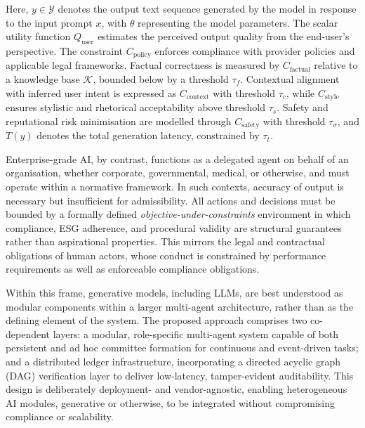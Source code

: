 \documentclass[oneside,10pt]{swissi}
\begin{document}
Here, $y \in \mathcal{Y}$ denotes the output text sequence generated by the model in response to the input prompt $x$, with $\theta$ representing the model parameters. The scalar utility function $Q_{\text{user}}$ estimates the perceived output quality from the end-user’s perspective. The constraint $C_{\text{policy}}$ enforces compliance with provider policies and applicable legal frameworks. Factual correctness is measured by $C_{\text{factual}}$ relative to a knowledge base $\mathcal{K}$, bounded below by a threshold $\tau_f$. Contextual alignment with inferred user intent is expressed as $C_{\text{context}}$ with threshold $\tau_c$, while $C_{\text{style}}$ ensures stylistic and rhetorical acceptability above threshold $\tau_s$. Safety and reputational risk minimisation are modelled through $C_{\text{safety}}$ with threshold $\tau_{\sigma}$, and $T(y)$ denotes the total generation latency, constrained by $\tau_t$.

Enterprise-grade AI, by contrast, functions as a delegated agent on behalf of an organisation, whether corporate, governmental, medical, or otherwise, and must operate within a normative framework.\cite{handbook_normative_mas,wooldridge2009} In such contexts, accuracy of output is necessary but insufficient for admissibility.\cite{eu_ai_act_2024} All actions and decisions must be bounded by a formally defined \emph{objective-under-constraints} environment in which compliance, ESG adherence, and procedural validity are structural guarantees rather than aspirational properties.\cite{nist_ai_rmf_2023,eu_ai_act_2024} This mirrors the legal and contractual obligations of human actors, whose conduct is constrained by performance requirements as well as enforceable compliance obligations.\cite{nist_ai_rmf_2023}

Within this frame, generative models, including LLMs, are best understood as modular components within a larger multi-agent architecture, rather than as the defining element of the system.\cite{wooldridge2009} The proposed approach comprises two co-dependent layers: a modular, role-specific multi-agent system capable of both persistent and ad hoc committee formation for continuous and event-driven tasks; and a distributed ledger infrastructure, incorporating a directed acyclic graph (DAG) verification layer to deliver low-latency, tamper-evident auditability.\cite{handbook_normative_mas,nistir8202,baird2016hashgraph} This design is deliberately deployment- and vendor-agnostic, enabling heterogeneous AI modules, generative or otherwise, to be integrated without compromising compliance or scalability.\cite{nist_ai_rmf_2023,nistir8202}
\end{document}
